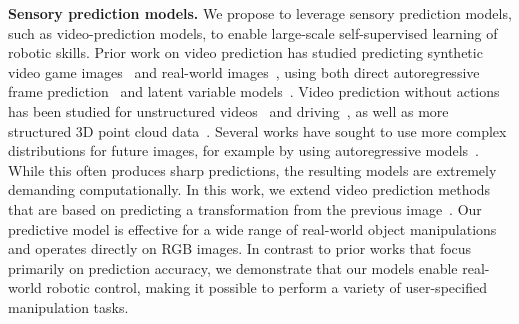 \noindent \textbf{Sensory prediction models.}
We propose to leverage sensory prediction models, such as video-prediction models, to enable large-scale self-supervised learning of robotic skills. Prior work on video prediction has studied predicting synthetic video game images~\cite{atarioh,recurrentsimulators} and real-world images~\cite{bootsetal,finn_nips,video_pixel_networks}, using both direct autoregressive frame prediction~\cite{beyond_mse,finn_nips,video_pixel_networks} and latent variable models~\cite{zhang2018solar,kurutach2018learning}. Video prediction without actions has been studied for unstructured videos~\cite{beyond_mse,convlstm,vondrick} and driving~\cite{prednet,dynamic_filter_networks}, as well as more structured 3D point cloud data~\cite{se3}. Several works have sought to use more complex distributions for future images, for example by using autoregressive models~\cite{video_pixel_networks,scott_reed}. While this often produces sharp predictions, the resulting models are extremely demanding computationally. In this work, we extend video prediction methods that are based on predicting a transformation from the previous image~\cite{finn_nips,dynamic_filter_networks}. 
Our predictive model is effective for a wide range of real-world object manipulations and operates directly on RGB images. In contrast to prior works that focus primarily on prediction accuracy, we demonstrate that our models enable real-world robotic control, making it possible to perform a variety of user-specified manipulation tasks.
